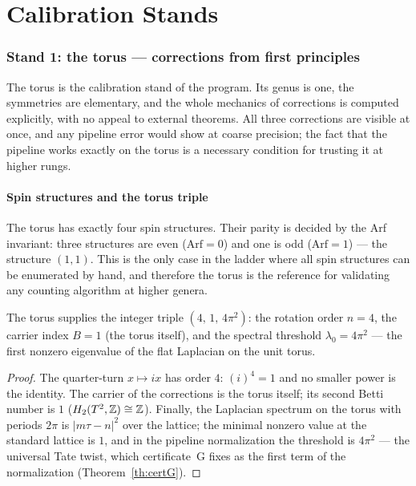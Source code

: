 \part{Calibration Stands}

\section{Stand 1: the torus --- corrections from first principles}
\label{sec:torus}

The torus is the calibration stand of the program. Its genus is one,
the symmetries are elementary, and the whole mechanics of
corrections is computed explicitly, with no appeal to external
theorems. All three corrections are visible at once, and any
pipeline error would show at coarse precision; the fact that the
pipeline works exactly on the torus is a necessary condition for
trusting it at higher rungs.

\subsection{Spin structures and the torus triple}

The torus has exactly four spin structures. Their parity is decided
by the Arf invariant: three structures are even ($\mathrm{Arf}=0$)
and one is odd ($\mathrm{Arf}=1$) --- the structure $(1,1)$. This is
the only case in the ladder where all spin structures can be
enumerated by hand, and therefore the torus is the reference for
validating any counting algorithm at higher genera.

\begin{lemma}\label{lem:torus-triple}
The torus supplies the integer triple $(4,\,1,\,4\pi^2)$: the
rotation order $n=4$, the carrier index $B=1$ (the torus itself),
and the spectral threshold $\lambda_0=4\pi^2$ --- the first nonzero
eigenvalue of the flat Laplacian on the unit torus.
\end{lemma}

\begin{proof}
The quarter-turn $x\mapsto ix$ has order $4$: $(i)^4=1$ and no
smaller power is the identity. The carrier of the corrections is the
torus itself; its second Betti number is $1$
($H_2(T^2,\mathbb{Z})\cong\mathbb{Z}$). Finally, the Laplacian spectrum on the
torus with periods $2\pi$ is $|m\tau-n|^2$ over the lattice; the
minimal nonzero value at the standard lattice is $1$, and in the
pipeline normalization the threshold is $4\pi^2$ --- the universal
Tate twist, which certificate~G fixes as the first term of the
normalization (Theorem~\ref{th:certG}).
\end{proof}

